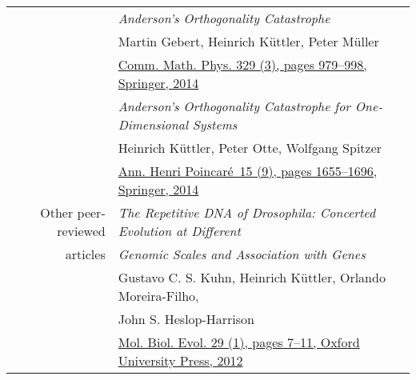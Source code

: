 \documentclass[11pt,english,a4paper]{memoir}
\makeatletter
\newcommand{\muelleratlmudotde}{mue\rlap{\textcolor{white}{hugo@egon}}ll\rlap{\textcolor{white}{@symmetry is overrated}}er@\rlap{\textcolor{white}{yesihatespamspamspam}}l\rlap{\textcolor{white}{spam@spam@spam!}}mu\rlap{\textcolor{white}{.com}}.de}
\newcommand{\juergenvoigtattudresdende}{juer\rlap{\textcolor{white}{hugo@egon}}gen.voi\rlap{\textcolor{white}{@symmetry is overrated}}gt@\rlap{\textcolor{white}{yesihatespamspamspam}}tu-\rlap{\textcolor{white}{spam@spam@spam!}}dres\rlap{\textcolor{white}{.com}}den.de}
\newcommand{\red}{\color{Maroon}}
\newcommand{\header}[1]{%
  \addlinespace[2ex]
  & \large{\red\textsc{\MakeLowercase{#1}}} \tabularnewline
  \midrule}
\newcommand{\n}{\tabularnewline}
\makeatother
\begin{document}
\begin{center}
\begin{tabular}{rl}
  & \textit{Anderson's Orthogonality Catastrophe} \\
  & Martin Gebert, Heinrich Küttler, Peter Müller \\
  & \href{http://dx.doi.org/10.1007/s00220-014-1914-3}{Comm. Math. Phys. 329 (3), pages 979--998,
  Springer, 2014} \n \addlinespace

  & \textit{Anderson's Orthogonality Catastrophe for One-Dimensional Systems}
  \\
  & Heinrich Küttler, Peter Otte, Wolfgang Spitzer \\
  & \href{http://dx.doi.org/10.1007/s00023-013-0287-z}{Ann. Henri Poincaré \,15 (9), pages 1655--1696, Springer, 2014}

  \n \addlinespace
  Other peer-reviewed & \textit{The Repetitive DNA of Drosophila:
  Concerted Evolution at Different}
  \\
  articles & \textit{Genomic Scales and Association with Genes} \\
  & Gustavo C. S. Kuhn, Heinrich Küttler, Orlando Moreira-Filho, \\
  & John S. Heslop-Harrison \\
  & \href{http://dx.doi.org/10.1093/molbev/msr173}{Mol. Biol. Evol. 29 (1), pages 7--11, Oxford University Press, 2012}



\end{tabular}

\end{center}



\end{document}
